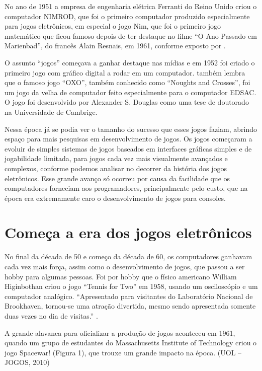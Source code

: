 No ano de 1951 a empresa de engenharia elétrica Ferranti do Reino Unido criou o computador NIMROD, que foi o primeiro computador produzido especialmente para jogos eletrônicos, em especial o jogo Nim, que foi o primeiro jogo matemático que ficou famoso depois de ter destaque no filme “O Ano Passado em Marienbad”, do francês Alain Resnais, em 1961, conforme exposto por \cite[p.~41]{Gularte}.

O assunto “jogos” começava a ganhar destaque nas mídias e em 1952 foi criado o primeiro jogo com gráfico digital a rodar em um computador. \cite[p.~41]{Gularte} também lembra que o famoso jogo “OXO”, também conhecido como “Noughts and Crosses”, foi um jogo da velha de computador feito especialmente para o computador EDSAC. O jogo foi desenvolvido por Alexander S. Douglas como uma tese de doutorado na Universidade de Cambrige.
 
Nessa época já se podia ver o tamanho do sucesso que esses jogos faziam, abrindo espaço para mais pesquisas em desenvolvimento de jogos. Os jogos começaram a evoluir de simples sistemas de jogos baseados em interfaces gráficas simples e de jogabilidade limitada, para jogos cada vez mais visualmente avançados e complexos, conforme podemos analisar no decorrer da história dos jogos eletrônicos. Esse grande avanço só ocorreu por causa da facilidade que os computadores forneciam aos programadores, principalmente pelo custo, que na época era extremamente caro o desenvolvimento de jogos para consoles.

\section{Começa a era dos jogos eletrônicos}

No final da década de 50 e começo da década de 60, os computadores ganhavam cada vez mais força, assim como o desenvolvimento de jogos, que passou a ser hobby para algumas pessoas. Foi por hobby que o físico americano William Higinbothan criou o jogo “Tennis for Two” em 1958, usando um osciloscópio e um computador analógico. “Apresentado para visitantes do Laboratório Nacional de Brookhaven, tornou-se uma atração divertida, mesmo sendo apresentada somente duas vezes no dia de visitas.” \cite[p.~41]{Gularte}. 

A grande alavanca para oficializar a produção de jogos aconteceu em 1961, quando um grupo de estudantes do Massachusetts Institute of Technology criou o jogo Spacewar! (Figura 1), que trouxe um grande impacto na época. (UOL – JOGOS, 2010)

